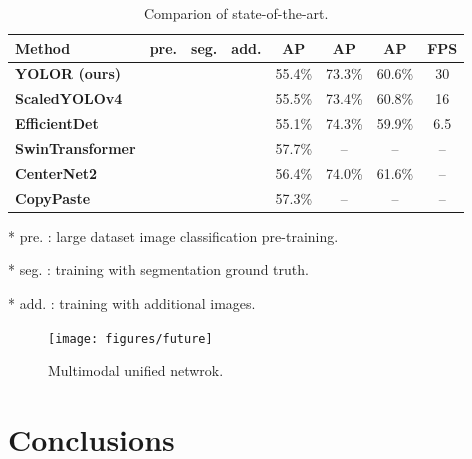 \documentclass[10pt,twocolumn,letterpaper]{article}
\begin{document}
\begin{table}[h]
\centering
\vspace{-2mm}
\begin{threeparttable}[h]
	\footnotesize
	\caption{Comparion of state-of-the-art.}
	\label{table:sota}
	\setlength\tabcolsep{.8pt}
	\begin{tabular}{lccccccc}
		\toprule
		\textbf{Method} & \textbf{pre.} & \textbf{seg.} & \textbf{add.} & \textbf{AP} & \textbf{AP} & \textbf{AP} & \textbf{FPS} \\				
		\midrule
		\textbf{YOLOR (ours)} &  &  &  & 55.4\% & 73.3\% & 60.6\% & 30 \\
		\textbf{ScaledYOLOv4 \cite{wang2020scaled}} &  &  &  & 55.5\% & 73.4\% & 60.8\% & 16 \\	
		\textbf{EfficientDet \cite{tan2019efficientdet}} &  &  &  & 55.1\% & 74.3\% & 59.9\% & 6.5 \\	
		\textbf{SwinTransformer \cite{liu2021swin}} &  &  &  & 57.7\% & -- & -- & -- \\	
		\textbf{CenterNet2 \cite{zhou2021probabilistic}} &  &  &  & 56.4\% & 74.0\% & 61.6\% & -- \\	
		\textbf{CopyPaste \cite{ghiasi2020simple}} &  &  &  & 57.3\% & -- & -- & -- \\
		\bottomrule
	\end{tabular}
	\begin{tablenotes}[flushleft]
		\footnotesize
		\item[*] pre. : large dataset image classification pre-training.
		\item[*] seg. : training with segmentation ground truth.
		\item[*] add. : training with additional images.
	\end{tablenotes}
\end{threeparttable}
\vspace{-6mm}
\end{table}

\begin{figure}[t]
	\begin{center}
		\texttt{[image: figures/future]}
	\end{center}
    \vspace{2mm}
	\caption{Multimodal unified netwrok.}
	\label{fig:fut}
	\vspace{-6mm}
\end{figure}

\section{Conclusions}
\end{document}
